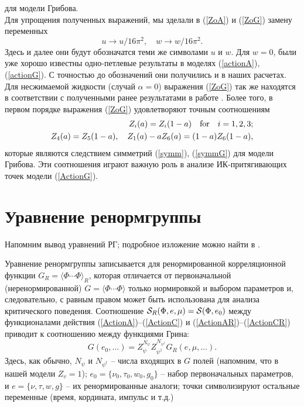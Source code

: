 \documentclass[a4paper,10pt]{article}
\def\S{{\cal S}}
\def\S{{\cal S}}
\begin{document}
для модели Грибова.\\
Для упрощения полученных выражений, мы зделали в (\ref{ZoA})
и  (\ref{ZoG}) замену переменных  \[ u \to u/16\pi^2, \quad w \to w/16\pi^2. \] Здесь и далее 
они будут  обозначатся теми же символами  $u$ и $w$.
Для $w=0$, были уже хорошо известны  одно-петлевые результаты в моделях (\ref{actionA}),
(\ref{actionG}). С точностью до обозначений они получились и в наших расчетах. Для несжимаемой жидкости (случай $\alpha=0$) выражения (\ref{ZoG}) так же находятся в соответствии
с полученными ранее результатами в работе \cite{AIK}. Более того, в первом порядке выражения (\ref{ZoG}) удовлетворяют точным соотношениям
\begin{eqnarray}
Z_{i} (a) = Z_{i} (1-a) \quad {\rm for} \quad i=1,2,3; \nonumber \\
Z_{4} (a) = Z_{5} (1-a), \quad
Z_{1} (a) -a Z_{6}(a) = (1-a) Z_{6}(1-a),
\label{GSymm}
\end{eqnarray}
которые являются следствием симметрий (\ref{symm}), (\ref{symmG}) для модели Грибова. Эти соотношения играют важную роль в анализе ИК-притягивающих точек модели 
(\ref{ActionG}).

\section{Уравнение ренормгруппы} \label{sec:RGE}

Напомним вывод уравнений РГ; подробное изложение можно найти в \cite{Zinn,Book3}.

Уравнение ренормгруппы записывается для ренормированной
корреляционной функции $G_{R} =\langle \Phi\cdots\Phi\rangle_{R}$,
которая отличается от первоначальной (неренормированной) $G
=\langle \Phi\cdots\Phi\rangle$ только нормировкой и выбором
параметров и, следовательно, с равным правом может быть
использована для анализа критического поведения.
Соотношение $\S_{R} (\Phi,e,\mu) =
\S(\Phi,e_{0})$ между функционалами действия (\ref{ActionA})--(\ref{ActionC})  и
(\ref{ActionAR})--(\ref{ActionCR}) приводит к соотношению между функциями Грина:
\begin{equation}
G(e_{0},\dots) = Z_{\psi}^{N_{\psi}}
Z_{\psi^{\dagger}}^{N_{\psi^{\dagger}}} G_{R}(e,\mu,\dots).
\label{multi}
\end{equation}
Здесь, как обычно, $N_{\psi}$ и $N_{\psi^{\dagger}}$ -- числа
входящих в $G$ полей (напомним, что в нашей модели
$Z_{v}=1$);  $e_{0}=\{\nu_{0}, \tau_{0}, w_{0}, g_{0} \}$ -- набор
первоначальных параметров, и $e=\{ \nu, \tau, w, g \}$ -- их
ренормированные аналоги; точки символизируют остальные переменные
(время, кордината, импульс и т.д.)
\end{document}
